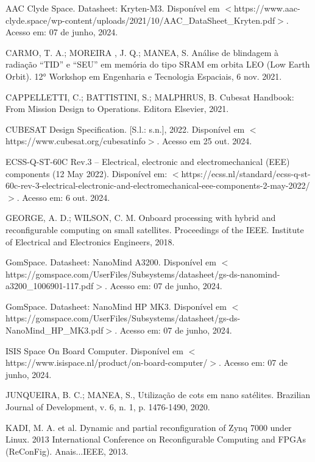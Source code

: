 \begin{flushleft}
\begin{thebibliography}{00} %
 AAC Clyde Space. Datasheet: Kryten-M3. Disponível em $<$https://www.aac-clyde.space/wp-content/uploads/2021/10/AAC\_DataSheet\_Kryten.pdf$>$.  Acesso em: 07 de junho, 2024.

 CARMO, T. A.; MOREIRA , J. Q.; MANEA, S. Análise de blindagem à radiação “TID” e “SEU” em memória do tipo SRAM em orbita LEO (Low Earth Orbit). 12° Workshop em Engenharia e Tecnologia Espaciais, 6 nov. 2021.

 CAPPELLETTI, C.; BATTISTINI, S.; MALPHRUS, B. Cubesat Handbook: From Mission Design to Operations. Editora Elsevier, 2021.

 CUBESAT Design Specification. [S.l.: s.n.], 2022. Disponível em $<$https://www.cubesat.org/cubesatinfo$>$. Acesso em 25 out. 2024.

 ECSS-Q-ST-60C Rev.3 – Electrical, electronic and electromechanical (EEE) components (12 May 2022). Disponível em: $<$https://ecss.nl/standard/ecss-q-st-60c-rev-3-electrical-electronic-and-electromechanical-eee-components-2-may-2022/$>$. Acesso em: 6 out. 2024.

 GEORGE, A. D.; WILSON, C. M. Onboard processing with hybrid and reconfigurable computing on small satellites. Proceedings of the IEEE. Institute of Electrical and Electronics Engineers, 2018.

 GomSpace. Datasheet: NanoMind A3200. Disponível em $<$https://gomspace.com/UserFiles/Subsystems/datasheet/gs-ds-nanomind-a3200\_1006901-117.pdf$>$. Acesso em: 07 de junho, 2024.

 GomSpace. Datasheet: NanoMind HP MK3. Disponível em $<$https://gomspace.com/UserFiles/Subsystems/datasheet/gs-ds-NanoMind\_HP\_MK3.pdf$>$. Acesso em: 07 de junho, 2024.

 ISIS Space On Board Computer. Disponível em $<$https://www.isispace.nl/product/on-board-computer/$>$. Acesso em: 07 de junho, 2024.

 JUNQUEIRA, B. C.; MANEA, S., Utilização de cots em nano satélites. Brazilian Journal of Development, v. 6, n. 1, p. 1476-1490, 2020.

 KADI, M. A. et al. Dynamic and partial reconfiguration of Zynq 7000 under Linux. 2013 International Conference on Reconfigurable Computing and FPGAs (ReConFig). Anais...IEEE, 2013.


\end{thebibliography}
\end{flushleft}
